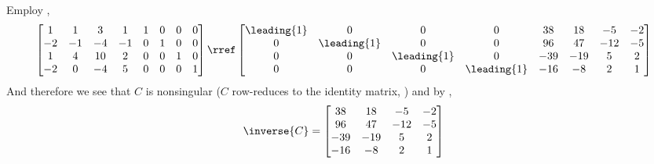 Employ ,
%
\begin{equation*}
\begin{bmatrix}
 1 & 1 & 3 & 1     &   1 & 0 & 0 & 0\\
 -2 & -1 & -4 & -1 &  0 & 1 & 0 & 0\\
 1 & 4 & 10 & 2   &   0 & 0 & 1 & 0\\
 -2 & 0 & -4 & 5	&	 0 & 0 & 0 & 1
 \end{bmatrix}
 \rref
 \begin{bmatrix}
 \leading{1} & 0 & 0 & 0	&	38 & 18 & -5 & -2\\
 0 & \leading{1} & 0 & 0 &	96 & 47 & -12 & -5\\
 0 & 0 & \leading{1} & 0	&	-39 & -19 & 5 & 2\\
 0 & 0 & 0 & \leading{1}	&	-16 & -8 & 2 & 1
 \end{bmatrix}
\end{equation*}
%
And therefore we see that $C$ is nonsingular ($C$ row-reduces to the identity matrix, ) and by ,
%
\begin{equation*}
\inverse{C}=
\begin{bmatrix}
38 & 18 & -5 & -2\\
96 & 47 & -12 & -5\\
-39 & -19 & 5 & 2\\
-16 & -8 & 2 & 1
\end{bmatrix}
\end{equation*}